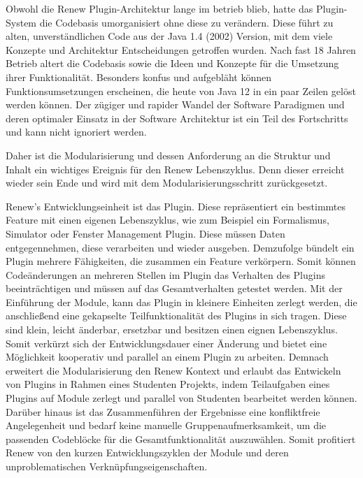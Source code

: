 Obwohl die Renew Plugin-Architektur lange im betrieb blieb, hatte das Plugin-System die Codebasis umorganisiert ohne diese zu verändern. Diese führt zu alten, unverständlichen Code aus der Java 1.4 (2002) Version, mit dem viele Konzepte und Architektur Entscheidungen getroffen wurden. Nach fast 18 Jahren Betrieb altert die Codebasis sowie die Ideen und Konzepte für die Umsetzung ihrer Funktionalität. Besonders konfus und aufgebläht können Funktionsumsetzungen erscheinen, die heute von Java 12 in ein paar Zeilen gelöst werden können. Der zügiger und rapider Wandel der Software Paradigmen und deren optimaler Einsatz in der Software Architektur ist ein Teil des Fortschritts und kann nicht ignoriert werden. 


Daher ist die Modularisierung und dessen Anforderung an die Struktur und Inhalt ein wichtiges Ereignis für den Renew Lebenszyklus. Denn dieser erreicht wieder sein Ende und wird mit dem Modularisierungsschritt zurückgesetzt. \bigbreak



Renew's Entwicklungseinheit ist das Plugin. Diese repräsentiert ein bestimmtes Feature mit einen eigenen Lebenszyklus, wie zum Beispiel ein Formalismus, Simulator oder Fenster Management Plugin. Diese müssen Daten entgegennehmen, diese verarbeiten und wieder ausgeben. Demzufolge bündelt ein Plugin mehrere Fähigkeiten, die zusammen ein Feature verkörpern. Somit können Codeänderungen an mehreren Stellen im Plugin das Verhalten des Plugins beeinträchtigen und müssen auf das Gesamtverhalten getestet werden. Mit der Einführung der Module, kann das Plugin in kleinere Einheiten zerlegt werden, die anschließend eine gekapselte Teilfunktionalität des Plugins in sich tragen. Diese sind klein, leicht änderbar, ersetzbar und besitzen einen eignen Lebenszyklus. Somit verkürzt sich der Entwicklungsdauer einer Änderung und bietet eine Möglichkeit kooperativ und parallel an einem Plugin zu arbeiten. Demnach erweitert die Modularisierung den Renew Kontext und erlaubt das Entwickeln von Plugins in Rahmen eines Studenten Projekts, indem Teilaufgaben eines Plugins auf Module zerlegt und parallel von Studenten bearbeitet werden können. Darüber hinaus ist das Zusammenführen der Ergebnisse eine konfliktfreie Angelegenheit und bedarf keine manuelle Gruppenaufmerksamkeit, um die passenden Codeblöcke für die Gesamtfunktionalität auszuwählen. Somit profitiert Renew von den kurzen Entwicklungszyklen der Module und deren unproblematischen Verknüpfungseigenschaften. 


 \newpage

